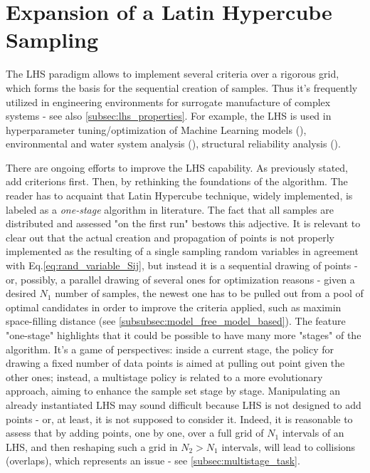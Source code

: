 \documentclass[12pt]{extarticle}
\newcommand{\meqref}[1]{Eq.\ref{#1}}
\begin{document}
\section{Expansion of a Latin Hypercube Sampling}
\label{sec:lhs_expansion}
The LHS paradigm allows to implement several criteria over a rigorous grid, which forms the basis for the sequential creation of samples. Thus it's frequently utilized in engineering environments for surrogate manufacture of complex systems - see also \cref{subsec:lhs_properties}. For example, the LHS is used in hyperparameter tuning/optimization of Machine Learning models (), environmental and water system analysis (), structural reliability analysis ().

There are ongoing efforts to improve the LHS capability. As previously stated, add criterions first. Then, by rethinking the foundations of the algorithm. The reader has to acquaint that Latin Hypercube technique, widely implemented, is labeled as a \textit{one-stage} algorithm in literature. The fact that all samples are distributed and assessed "on the first run" bestows this adjective. It is relevant to clear out that the actual creation and propagation of points is not properly implemented as the resulting of a single sampling random variables in agreement with \meqref{eq:rand_variable_Sij}, but instead it is a sequential drawing of points - or, possibly, a parallel drawing of several ones for optimization reasons - given a desired $N_1$ number of samples, the newest one has to be pulled out from a pool of optimal candidates in order to improve the criteria applied, such as maximin space-filling distance (see \cref{subsubsec:model_free_model_based}). The feature "one-stage" highlights that it could be possible to have many more "stages" of the algorithm. It's a game of perspectives: inside a current stage, the policy for drawing a fixed number of data points is aimed at pulling out point given the other ones; instead, a multistage policy is related to a more evolutionary approach, aiming to enhance the sample set stage by stage. Manipulating an already instantiated LHS may sound difficult because LHS is not designed to add points - or, at least, it is not supposed to consider it. Indeed, it is reasonable to assess that by adding points, one by one, over a full grid of $N_1$ intervals of an LHS, and then reshaping such a grid in $N_2 > N_1$ intervals, will lead to collisions (overlaps), which represents an issue - see \cref{subsec:multistage_task}.
\end{document}
